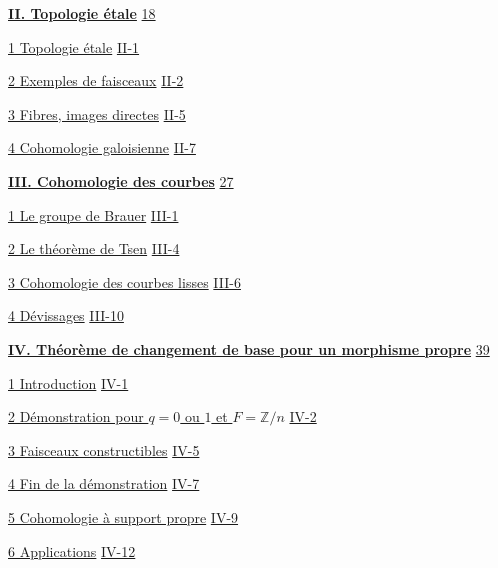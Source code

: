 \hyperref[I:2]{\textbf{II. Topologie étale}}\dotfill
  \hyperref[I:2]{18}\par
\hspace*{1.5em}\hyperref[I:2-1]{1 Topologie étale}\dotfill
  \hyperref[I:2-1]{II-1}\par
\hspace*{1.5em}\hyperref[I:2-2]{2 Exemples de faisceaux}\dotfill
  \hyperref[I:2-2]{II-2}\par
\hspace*{1.5em}\hyperref[I:2-3]{3 Fibres, images directes}\dotfill
  \hyperref[I:2-3]{II-5}\par
\hspace*{1.5em}\hyperref[I:2-4]{4 Cohomologie galoisienne}\dotfill
  \hyperref[I:2-4]{II-7}\par

\hyperref[I:3]{\textbf{III. Cohomologie des courbes}}\dotfill
  \hyperref[I:3]{27}\par
\hspace*{1.5em}\hyperref[I:3-1]{1 Le groupe de Brauer}\dotfill
  \hyperref[I:3-1]{III-1}\par
\hspace*{1.5em}\hyperref[I:3-2]{2 Le théorème de Tsen}\dotfill
  \hyperref[I:3-2]{III-4}\par
\hspace*{1.5em}\hyperref[I:3-3]{3 Cohomologie des courbes lisses}\dotfill
  \hyperref[I:3-3]{III-6}\par
\hspace*{1.5em}\hyperref[I:3-4]{4 Dévissages}\dotfill
  \hyperref[I:3-4]{III-10}\par

\hyperref[I:4]{\textbf{IV. Théorème de changement de base pour un morphisme propre}}\dotfill
  \hyperref[I:4]{39}\par
\hspace*{1.5em}\hyperref[I:4-1]{1 Introduction}\dotfill
  \hyperref[I:4-1]{IV-1}\par
\hspace*{1.5em}\hyperref[I:4-2]{2 Démonstration pour $q=0$ ou $1$ et $F=\mathbb Z/n$}\dotfill
  \hyperref[I:4-2]{IV-2}\par
\hspace*{1.5em}\hyperref[I:4-3]{3 Faisceaux constructibles}\dotfill
  \hyperref[I:4-3]{IV-5}\par
\hspace*{1.5em}\hyperref[I:4-4]{4 Fin de la démonstration}\dotfill
  \hyperref[I:4-4]{IV-7}\par
\hspace*{1.5em}\hyperref[I:4-5]{5 Cohomologie à support propre}\dotfill
  \hyperref[I:4-5]{IV-9}\par
\hspace*{1.5em}\hyperref[I:4-6]{6 Applications}\dotfill
  \hyperref[I:4-6]{IV-12}\par

